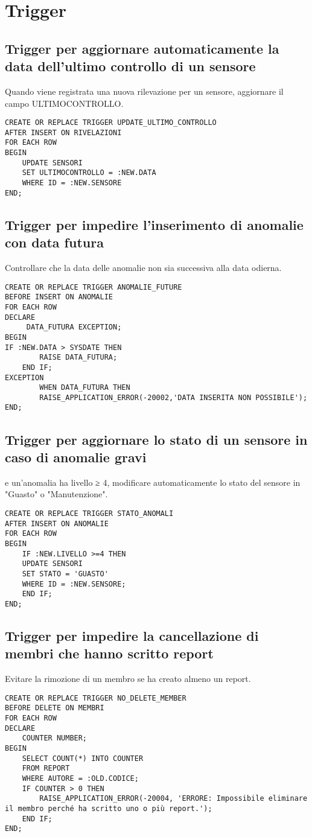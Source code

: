 \section{Trigger}
\begin{description}
\subsection{Trigger per aggiornare automaticamente la data dell'ultimo controllo di un sensore}
Quando viene registrata una nuova rilevazione per un sensore, aggiornare il campo ULTIMOCONTROLLO.
\begin{verbatim}
CREATE OR REPLACE TRIGGER UPDATE_ULTIMO_CONTROLLO
AFTER INSERT ON RIVELAZIONI
FOR EACH ROW
BEGIN
    UPDATE SENSORI
    SET ULTIMOCONTROLLO = :NEW.DATA
    WHERE ID = :NEW.SENSORE
END;
\end{verbatim}
\subsection{Trigger per impedire l'inserimento di anomalie con data futura}
Controllare che la data delle anomalie non sia successiva alla data odierna.
\begin{verbatim}
CREATE OR REPLACE TRIGGER ANOMALIE_FUTURE
BEFORE INSERT ON ANOMALIE
FOR EACH ROW
DECLARE 
     DATA_FUTURA EXCEPTION;
BEGIN 
IF :NEW.DATA > SYSDATE THEN
        RAISE DATA_FUTURA;
    END IF;    
EXCEPTION 
        WHEN DATA_FUTURA THEN 
        RAISE_APPLICATION_ERROR(-20002,'DATA INSERITA NON POSSIBILE');
END;
\end{verbatim}
\subsection{Trigger per aggiornare lo stato di un sensore in caso di anomalie gravi}
e un'anomalia ha livello ≥ 4, modificare automaticamente lo stato del sensore in "Guasto" o "Manutenzione".
\begin{verbatim}
CREATE OR REPLACE TRIGGER STATO_ANOMALI
AFTER INSERT ON ANOMALIE
FOR EACH ROW
BEGIN
    IF :NEW.LIVELLO >=4 THEN
    UPDATE SENSORI
    SET STATO = 'GUASTO'
    WHERE ID = :NEW.SENSORE;
    END IF;
END;
\end{verbatim}
\subsection{Trigger per impedire la cancellazione di membri che hanno scritto report}
Evitare la rimozione di un membro se ha creato almeno un report.
\begin{verbatim}
CREATE OR REPLACE TRIGGER NO_DELETE_MEMBER
BEFORE DELETE ON MEMBRI
FOR EACH ROW
DECLARE
    COUNTER NUMBER;
BEGIN
    SELECT COUNT(*) INTO COUNTER
    FROM REPORT
    WHERE AUTORE = :OLD.CODICE;
    IF COUNTER > 0 THEN
        RAISE_APPLICATION_ERROR(-20004, 'ERRORE: Impossibile eliminare il membro perché ha scritto uno o più report.');
    END IF;
END;
\end{verbatim}
\end{description}
